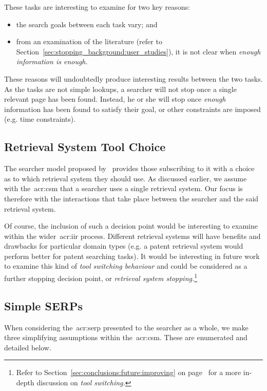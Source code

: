 These tasks are interesting to examine for two key reasons:

\begin{itemize}
    \item{the search goals between each task vary; and}
    \item{from an examination of the literature (refer to Section~\ref{sec:stopping_background:user_studies}), it is not clear when \emph{enough information is enough.}}
\end{itemize}

These reasons will undoubtedly produce interesting results between the two tasks. As the tasks are not simple lookups, a searcher will not stop once a single relevant page has been found. Instead, he or she will stop once \emph{enough}~\citep{zach2005enough_is_enough} information has been found to satisfy their goal, or other constraints are imposed (e.g. time constraints).

\subsection{Retrieval System Tool Choice}\label{sec:csm:assumptions:tool}
The searcher model proposed by~\cite{thomas2014modelling_behaviour} provides those subscribing to it with a choice as to which retrieval system they should use. As discussed earlier, we assume with the~\gls{acr:csm} that a searcher uses a single retrieval system. Our focus is therefore with the interactions that take place between the searcher and the said retrieval system.

Of course, the inclusion of such a decision point would be interesting to examine within the wider~\gls{acr:iir} process. Different retrieval systems will have benefits and drawbacks for particular domain types (e.g. a patent retrieval system would perform better for patent searching tasks). It would be interesting in future work to examine this kind of \emph{tool switching behaviour} and could be considered as a further stopping decision point, or \emph{retrieval system stopping.}\footnote{Refer to Section~\ref{sec:conclusions:future:improving} on page~\pageref{sec:conclusions:future:improving} for a more in-depth discussion on \emph{tool switching.}}

\subsection{Simple SERPs}
When considering the~\gls{acr:serp} presented to the searcher as a whole, we make three simplifying assumptions within the~\gls{acr:csm}. These are enumerated and detailed below.

